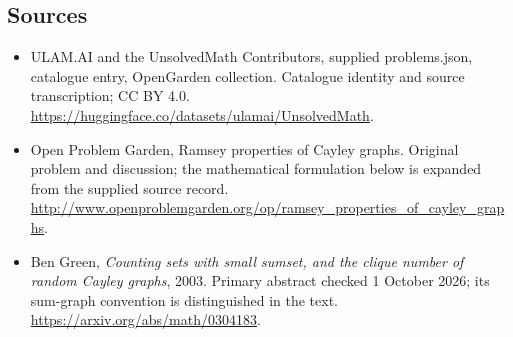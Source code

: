 \documentclass[11pt,a4paper]{article}
\begin{document}
\subsection{Sources}
\begin{itemize}
\item[S1] ULAM.AI and the UnsolvedMath Contributors, supplied problems.json, catalogue entry, OpenGarden collection. Catalogue identity and source transcription; CC BY 4.0.
\url{https://huggingface.co/datasets/ulamai/UnsolvedMath}.
\item[S2] Open Problem Garden, Ramsey properties of Cayley graphs. Original problem and discussion; the mathematical formulation below is expanded from the supplied source record.
\url{http://www.openproblemgarden.org/op/ramsey_properties_of_cayley_graphs}.

\item[R1] Ben Green, \emph{Counting sets with small sumset, and the
clique number of random Cayley graphs}, 2003. Primary abstract checked
1 October 2026; its sum-graph convention is distinguished in the text.
\url{https://arxiv.org/abs/math/0304183}.

\end{itemize}
\end{document}
